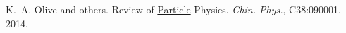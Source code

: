 
\begin{DoxyDescription}
\item[\label{citelist_CITEREF_PDGlist}%
\Hypertarget{citelist_CITEREF_PDGlist}%
\mbox{[}1\mbox{]}]K.~A. Olive and others. Review of \mbox{\hyperlink{class_particle}{Particle}} Physics. {\itshape Chin. Phys.}, C38\+:090001, 2014. 


\end{DoxyDescription}